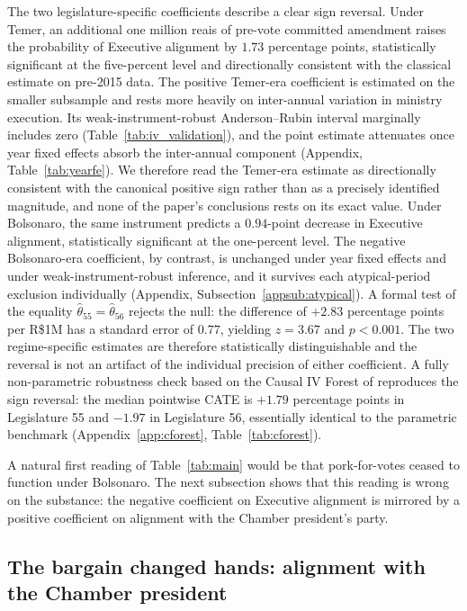 \documentclass[pdflatex,sn-basic]{sn-jnl}
\begin{document}
The two legislature-specific coefficients describe a clear sign reversal. Under Temer, an additional one million reais of pre-vote committed amendment raises the probability of Executive alignment by $1.73$ percentage points, statistically significant at the five-percent level and directionally consistent with the classical \citet{PereiraAndMueller2004} estimate on pre-2015 data. The positive Temer-era coefficient is estimated on the smaller subsample and rests more heavily on inter-annual variation in ministry execution. Its weak-instrument-robust Anderson--Rubin interval marginally includes zero (Table~\ref{tab:iv_validation}), and the point estimate attenuates once year fixed effects absorb the inter-annual component (Appendix, Table~\ref{tab:yearfe}). We therefore read the Temer-era estimate as directionally consistent with the canonical positive sign rather than as a precisely identified magnitude, and none of the paper's conclusions rests on its exact value. Under Bolsonaro, the same instrument predicts a $0.94$-point decrease in Executive alignment, statistically significant at the one-percent level. The negative Bolsonaro-era coefficient, by contrast, is unchanged under year fixed effects and under weak-instrument-robust inference, and it survives each atypical-period exclusion individually (Appendix, Subsection~\ref{appsub:atypical}). A formal test of the equality $\hat\theta_{55} = \hat\theta_{56}$ rejects the null: the difference of $+2.83$ percentage points per R\$1M has a standard error of $0.77$, yielding $z = 3.67$ and $p < 0.001$. The two regime-specific estimates are therefore statistically distinguishable and the reversal is not an artifact of the individual precision of either coefficient. A fully non-parametric robustness check based on the Causal IV Forest of \citet{AtheyTibshiraniWager2019} reproduces the sign reversal: the median pointwise CATE is $+1.79$ percentage points in Legislature 55 and $-1.97$ in Legislature 56, essentially identical to the parametric benchmark (Appendix~\ref{app:cforest}, Table~\ref{tab:cforest}).

A natural first reading of Table~\ref{tab:main} would be that pork-for-votes ceased to function under Bolsonaro. The next subsection shows that this reading is wrong on the substance: the negative coefficient on Executive alignment is mirrored by a positive coefficient on alignment with the Chamber president's party.

\subsection{The bargain changed hands: alignment with the Chamber president}
\label{subsec:legislative_capture}
\end{document}
